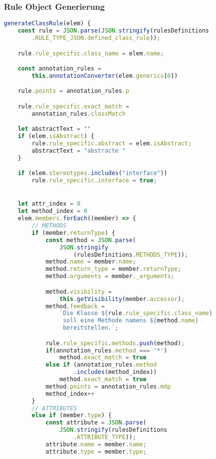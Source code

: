 \subsubsection{Rule Object Generierung}
\begin{lstlisting}[caption={Class Definition Rule}, label={lst:rule_object_gen}, language=javascript]
generateClassRule(elem) {
    const rule = JSON.parse(JSON.stringify(rulesDefinitions
        .RULE_TYPE_JSON.defined_class_rule));

    rule.rule_specific.class_name = elem.name;

    const annotation_rules =
        this.annotationConverter(elem.generics[0])

    rule.points = annotation_rules.p

    rule.rule_specific.exact_match =
        annotation_rules.classMatch

    let abstractText = ""
    if (elem.isAbstract) {
        rule.rule_specific.abstract = elem.isAbstract;
        abstractText = "abstracte "
    }

    if (elem.stereotypes.includes("interface"))
        rule.rule_specific.interface = true;


    let attr_index = 0
    let method_index = 0
    elem.members.forEach((member) => {
        // METHODS
        if (member.returnType) {
            const method = JSON.parse(
                JSON.stringify
                    (rulesDefinitions.METHODS_TYPE));
            method.name = member.name;
            method.return_type = member.returnType;
            method.arguments = member._arguments;

            method.visibility =
                this.getVisibility(member.accessor);
            method.feedback =
                `Die Klasse ${rule.rule_specific.class_name}
                 soll eine Methode namens ${method.name}
                 bereitstellen.`;

            rule.rule_specific.methods.push(method);
            if(annotation_rules.method === '*')
                method.exact_match = true
            else if (annotation_rules.method
                    .includes(method_index))
                method.exact_match = true
            method.points = annotation_rules.mdp
            method_index++
        }
        // ATTRIBUTES
        else if (member.type) {
            const attribute = JSON.parse(
                JSON.stringify(rulesDefinitions
                    .ATTRIBUTE_TYPE));
            attribute.name = member.name;
            attribute.type = member.type;


\end{lstlisting}
